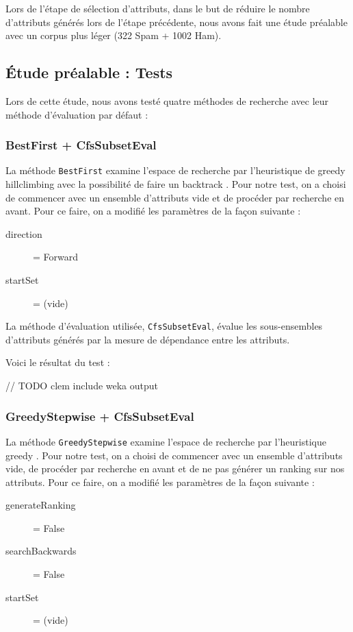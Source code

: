 Lors de l'étape de sélection d'attributs, dans le but de réduire le nombre d'attributs générés lors de l'étape précédente, nous avons fait une étude préalable avec un corpus plus léger (322 Spam + 1002 Ham). 

\subsection{Étude préalable : Tests}
Lors de cette étude, nous avons testé quatre méthodes de recherche avec leur méthode d'évaluation par défaut :

\subsubsection{BestFirst + CfsSubsetEval}

La méthode \texttt{BestFirst} examine l'espace de recherche par l'heuristique de \og greedy hillclimbing \fg{} avec la possibilité de faire un  \og backtrack \fg{}.  Pour notre test, on a choisi de commencer avec un ensemble d'attributs vide et de procéder par recherche en avant. Pour ce faire, on a modifié les paramètres de la façon suivante : 
\begin{description}
	\item[direction] = Forward
	\item[startSet] = (vide)
\end{description}

La méthode d'évaluation utilisée, \texttt{CfsSubsetEval}, évalue les sous-ensembles d'attributs générés par la mesure de dépendance entre les attributs.

Voici le résultat du test :

// TODO clem include weka output

\subsubsection{GreedyStepwise + CfsSubsetEval}

La méthode \texttt{GreedyStepwise} examine l'espace de recherche par l'heuristique \og greedy \fg{}. Pour notre test, on a choisi de commencer avec un ensemble d'attributs vide, de procéder par recherche en avant et de ne pas générer un \og ranking \fg{} sur nos attributs. Pour ce faire, on a modifié les paramètres de la façon suivante : 
\begin{description}
	\item[generateRanking] = False
	\item[searchBackwards] = False
	\item[startSet] = (vide)
\end{description}

